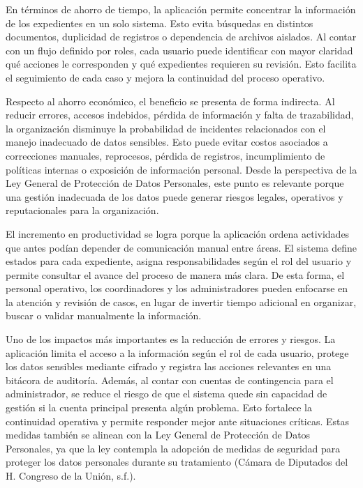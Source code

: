\documentclass[10pt, letterpaper]{article}
\begin{document}
En términos de ahorro de tiempo, la aplicación permite concentrar la información de los expedientes en un solo sistema. Esto evita búsquedas en distintos documentos, duplicidad de registros o dependencia de archivos aislados. Al contar con un flujo definido por roles, cada usuario puede identificar con mayor claridad qué acciones le corresponden y qué expedientes requieren su revisión. Esto facilita el seguimiento de cada caso y mejora la continuidad del proceso operativo.

Respecto al ahorro económico, el beneficio se presenta de forma indirecta. Al reducir errores, accesos indebidos, pérdida de información y falta de trazabilidad, la organización disminuye la probabilidad de incidentes relacionados con el manejo inadecuado de datos sensibles. Esto puede evitar costos asociados a correcciones manuales, reprocesos, pérdida de registros, incumplimiento de políticas internas o exposición de información personal. Desde la perspectiva de la Ley General de Protección de Datos Personales, este punto es relevante porque una gestión inadecuada de los datos puede generar riesgos legales, operativos y reputacionales para la organización.

El incremento en productividad se logra porque la aplicación ordena actividades que antes podían depender de comunicación manual entre áreas. El sistema define estados para cada expediente, asigna responsabilidades según el rol del usuario y permite consultar el avance del proceso de manera más clara. De esta forma, el personal operativo, los coordinadores y los administradores pueden enfocarse en la atención y revisión de casos, en lugar de invertir tiempo adicional en organizar, buscar o validar manualmente la información.

Uno de los impactos más importantes es la reducción de errores y riesgos. La aplicación limita el acceso a la información según el rol de cada usuario, protege los datos sensibles mediante cifrado y registra las acciones relevantes en una bitácora de auditoría. Además, al contar con cuentas de contingencia para el administrador, se reduce el riesgo de que el sistema quede sin capacidad de gestión si la cuenta principal presenta algún problema. Esto fortalece la continuidad operativa y permite responder mejor ante situaciones críticas. Estas medidas también se alinean con la Ley General de Protección de Datos Personales, ya que la ley contempla la adopción de medidas de seguridad para proteger los datos personales durante su tratamiento (Cámara de Diputados del H. Congreso de la Unión, s.f.).
\end{document}
